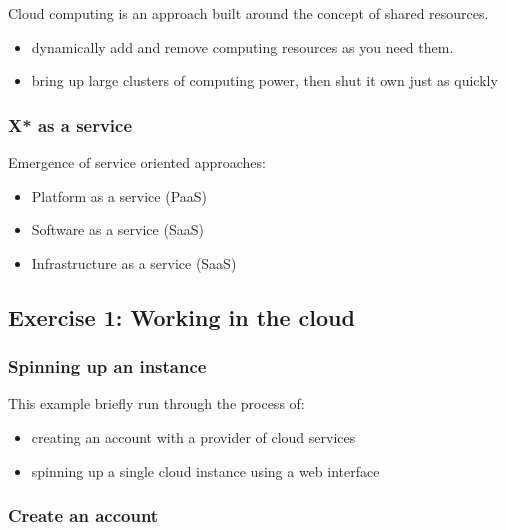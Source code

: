 Cloud computing is an approach built around the concept of shared
resources.

\begin{itemize}
\itemsep1pt\parskip0pt
\item
  dynamically add and remove computing resources as you need them.
\item
  bring up large clusters of computing power, then shut it own just as
  quickly
\end{itemize}

\subsubsection{X* as a service}\label{x-as-a-service}

Emergence of service oriented approaches:

\begin{itemize}
\itemsep1pt\parskip0pt
\item
  Platform as a service (PaaS)
\item
  Software as a service (SaaS)
\item
  Infrastructure as a service (SaaS)
\end{itemize}

\subsection{Exercise 1: Working in the
cloud}\label{exercise-1-working-in-the-cloud}

\subsubsection{Spinning up an instance}\label{spinning-up-an-instance}

This example briefly run through the process of:

\begin{itemize}
\itemsep1pt\parskip0pt
\item
  creating an account with a provider of cloud services
\item
  spinning up a single cloud instance using a web interface
\end{itemize}

\subsubsection{Create an account}\label{create-an-account}

